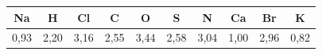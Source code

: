 \documentclass[border=4pt]{standalone}
\begin{document}
\renewcommand{\arraystretch}{1.55}
\setlength{\tabcolsep}{0pt}
\begin{tabular}{|*{10}{C|}}
\hline
\textbf{\large Na} & \textbf{\large H} & \textbf{\large Cl} & \textbf{\large C} & \textbf{\large O} & \textbf{\large S} & \textbf{\large N} & \textbf{\large Ca} & \textbf{\large Br} & \textbf{\large K} \\
\hline
\large 0,93 & \large 2,20 & \large 3,16 & \large 2,55 & \large 3,44 & \large 2,58 & \large 3,04 & \large 1,00 & \large 2,96 & \large 0,82 \\
\hline
\end{tabular}
\end{document}
